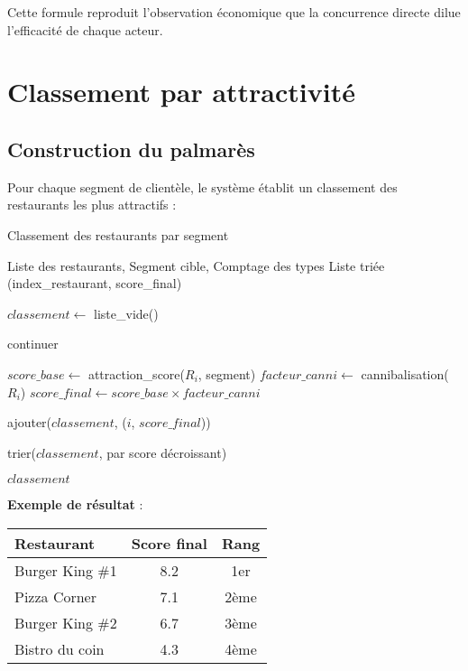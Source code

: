 \documentclass[12pt,a4paper]{article}
\begin{document}
Cette formule reproduit l'observation économique que la concurrence directe dilue l'efficacité de chaque acteur.

\section{Classement par attractivité}

\subsection{Construction du palmarès}

Pour chaque segment de clientèle, le système établit un classement des restaurants les plus attractifs :

\begin{algorithm}[H]
\caption{Classement des restaurants par segment}
\begin{algorithmic}[1]
\REQUIRE Liste des restaurants, Segment cible, Comptage des types
\ENSURE Liste triée (index\_restaurant, score\_final)

\STATE $classement \leftarrow$ liste\_vide()

        \STATE continuer 
    \ENDIF

    \STATE $score\_base \leftarrow$ attraction\_score($R_i$, segment)
    \STATE $facteur\_canni \leftarrow$ cannibalisation($R_i$)
    \STATE $score\_final \leftarrow score\_base \times facteur\_canni$

    \STATE ajouter($classement$, ($i$, $score\_final$))
\ENDFOR

\STATE trier($classement$, par score décroissant)

\RETURN $classement$
\end{algorithmic}
\end{algorithm}

\textbf{Exemple de résultat} :
\begin{center}
\begin{tabular}{lcc}
\toprule
Restaurant & Score final & Rang \\
\midrule
Burger King \#1 & 8.2 & 1er \\
Pizza Corner & 7.1 & 2ème \\
Burger King \#2 & 6.7 & 3ème \\
Bistro du coin & 4.3 & 4ème \\
\bottomrule
\end{tabular}
\end{center}
\end{document}
